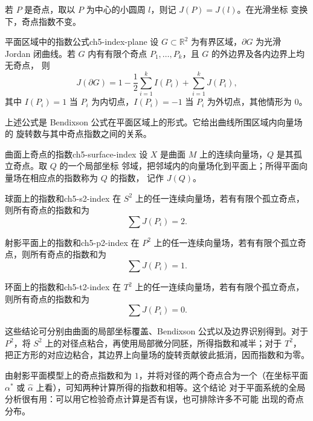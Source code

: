 若 $P$ 是奇点，取以 $P$ 为中心的小圆周 $l$，则记 $J(P)=J(l)$。在光滑坐标
变换下，奇点指数不变。

\begin{theorem}{平面区域中的指数公式}{ch5-index-plane}
设 $G\subset\mathbb R^2$ 为有界区域，$\partial G$ 为光滑 Jordan 闭曲线。若
$G$ 内有有限个奇点 $P_1,\ldots,P_k$，且 $G$ 的外边界及各内边界上均无奇点，
则
\[
  J(\partial G)=1-\dfrac12\sum_{i=1}^k I(P_i)+\sum_{i=1}^k J(P_i),
\]
其中 $I(P_i)=1$ 当 $P_i$ 为内切点，$I(P_i)=-1$ 当 $P_i$ 为外切点，其他情形为
$0$。
\end{theorem}

上述公式是 Bendixson 公式在平面区域上的形式。它给出曲线所围区域内向量场的
旋转数与其中奇点指数之间的关系。

\begin{definition}{曲面上奇点的指数}{ch5-surface-index}
设 $X$ 是曲面 $M$ 上的连续向量场，$Q$ 是其孤立奇点。取 $Q$ 的一个局部坐标
邻域，把邻域内的向量场化到平面上；所得平面向量场在相应点的指数称为 $Q$ 的指数，
记作 $J(Q)$。
\end{definition}

\begin{theorem}{球面上的指数和}{ch5-s2-index}
在 $S^2$ 上的任一连续向量场，若有有限个孤立奇点，则所有奇点的指数和为
\[
  \sum J(P_i)=2.
\]
\end{theorem}

\begin{theorem}{射影平面上的指数和}{ch5-p2-index}
在 $P^2$ 上的任一连续向量场，若有有限个孤立奇点，则所有奇点的指数和为
\[
  \sum J(P_i)=1.
\]
\end{theorem}

\begin{theorem}{环面上的指数和}{ch5-t2-index}
在 $T^2$ 上的任一连续向量场，若有有限个孤立奇点，则所有奇点的指数和为
\[
  \sum J(P_i)=0.
\]
\end{theorem}

这些结论可分别由曲面的局部坐标覆盖、Bendixson 公式以及边界识别得到。对于
$P^2$，将 $S^2$ 上的对径点粘合，再使用局部微分同胚，所得指数和减半；对于
$T^2$，把正方形的对应边粘合，其边界上向量场的旋转贡献彼此抵消，因而指数和为零。


由射影平面模型上的奇点指数和为 $1$，并将对径的两个奇点合为一个（在坐标平面
$\alpha^*$ 或 $\widehat\alpha$ 上看），可知两种计算所得的指数和相等。这个结论
对于平面系统的全局分析很有用：可以用它检验奇点计算是否有误，也可排除许多不可能
出现的奇点分布。

